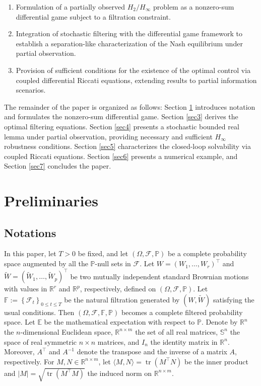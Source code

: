 \documentclass[lettersize,journal]{IEEEtran}
\theoremstyle{plain}
\theoremstyle{definition}
\begin{document}
\begin{enumerate}
	\item Formulation of a partially observed $H_2/H_\infty$ problem as a nonzero-sum differential game subject to a filtration constraint.
	\item Integration of stochastic filtering with the differential game framework to establish a separation-like characterization of the Nash equilibrium under partial observation.
	\item Provision of sufficient conditions for the existence of the optimal control via coupled differential Riccati equations, extending results to partial information scenarios.
\end{enumerate}

The remainder of the paper is organized as follows: Section \ref{sec2} introduces notation and formulates the nonzero-sum differential game. Section \ref{sec3} derives the optimal filtering equations. Section \ref{sec4} presents a stochastic bounded real lemma under partial observation, providing necessary and sufficient $H_\infty$ robustness conditions. Section \ref{sec5} characterizes the closed-loop solvability via coupled Riccati equations. Section \ref{sec6} presents a numerical example, and Section \ref{sec7} concludes the paper.

\section{Preliminaries}\label{sec2}

\subsection{Notations}
In this paper, let $T>0$ be fixed, and let $(\Omega,\mathcal{F},\mathbb{P})$ be a complete probability space augmented by all the $\mathbb{P}$-null sets in $\mathcal{F}$. Let ${W=\left(W_{1}, \ldots, W_{r}\right)^{\top}}$ and ${\widetilde{W}=(\widetilde{W}_{1}, \ldots, \widetilde{W}_{p})^{\top}}$ be two mutually independent standard Brownian motions with values in $\mathbb{R}^r$ and $\mathbb{R}^p$, respectively, defined on $(\Omega, \mathcal{F}, \mathbb{P})$. Let \( \mathbb{F}:=\left\{\mathcal{F}_{t}\right\}_{0 \leq t \leq T} \) be the natural filtration generated by \( (W, \widetilde{W}) \) satisfying the usual conditions. Then \( (\Omega, \mathcal{F}, \mathbb{F}, \mathbb{P}) \) becomes a complete filtered probability space. Let $\mathbb{E}$ be the mathematical expectation with respect to $\mathbb{P}$. Denote by $\mathbb{R}^n$ the $n$-dimensional Euclidean space, $\mathbb{R}^{n\times m}$ the set of all real matrices, $\mathbb{S}^n$ the space of real symmetric $n \times n$ matrices, and $I_n$ the identity matrix in $\mathbb{R}^n$. Moreover, $A^\top$ and $A^{-1}$ denote the transpose and the inverse of a matrix $A$, respectively. For \( M, N \in \mathbb{R}^{n \times m} \), let \( \langle M, N\rangle = \operatorname{tr}(M^{\top} N) \) be the inner product and \( |M| = \sqrt{\operatorname{tr}(M^{\top} M)} \) the induced norm on \( \mathbb{R}^{n\times m} \).
\end{document}
